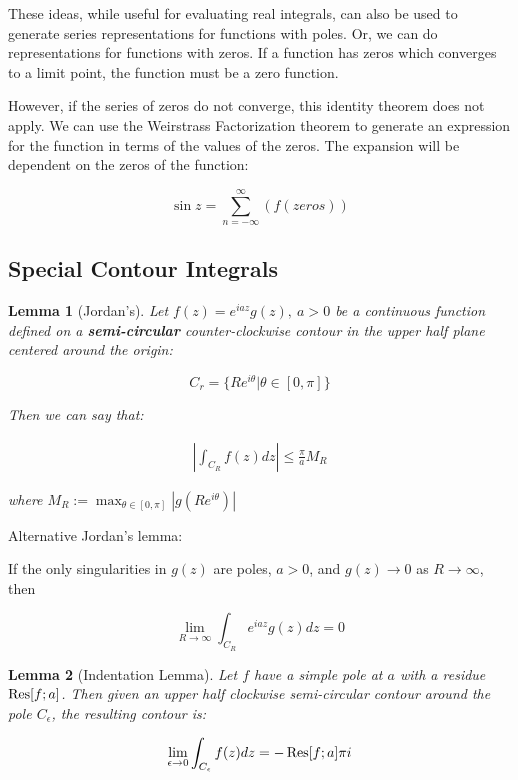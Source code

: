 \documentclass{article}
\newtheorem{lemma}{Lemma}
\theoremstyle{definition}
\begin{document}
These ideas, while useful for evaluating real integrals, can also be used to generate series representations for functions with poles. Or, we can do representations for functions with zeros. If a function has zeros which converges to a limit point, the function must be a zero function. 

However, if the series of zeros do not converge, this identity theorem does not apply. We can use the Weirstrass Factorization theorem to generate an expression for the function in terms of the values of the zeros. The expansion will be dependent on the zeros of the function:

$$\sin z = \sum_{n=-\infty}^{\infty}(f(zeros))$$

\subsection{Special Contour Integrals}
\begin{lemma}[Jordan's]
Let $f(z) = e^{iaz}g(z),\ a>0$ be a continuous function defined on a \textbf{semi-circular} counter-clockwise contour in the upper half plane centered around the origin:

$$C_r = \{Re^{i\theta}| \theta \in [0, \pi]\}$$

Then we can say that:

\begin{align*}
\left|\int_{C_R}f(z) dz\right| \leq \frac{\pi}{a} M_R
\end{align*}

where $M_R := \max_{\theta \in [0,\pi]}|g(Re^{i\theta})|$ 
\end{lemma}

Alternative Jordan's lemma:

If the only singularities in $g(z)$ are poles, $a>0$, and $g(z) \to 0$ as $R \to \infty$, then 

$$\lim_{R \to \infty} \int_{C_R}e^{iaz}g(z) dz = 0$$

\begin{lemma}[Indentation Lemma]
Let $f$ have a simple pole at $a$ with a residue $\Res[f;a]$. Then given an upper half clockwise semi-circular contour around the pole $C_\epsilon$, the resulting contour is:

\begin{align*}
\lim_{\epsilon\to0} \int_{C_\epsilon} f(z) dz = -\Res[f;a]\pi i
\end{align*}
\end{lemma}

\end{document}
